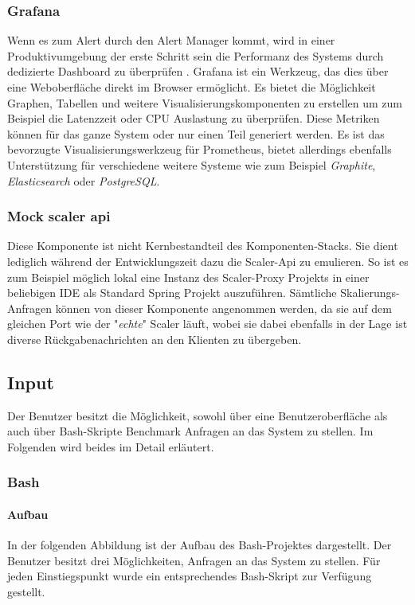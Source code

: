 \subsubsection{Grafana \checkmark}
Wenn es zum Alert durch den Alert Manager kommt, wird in einer Produktivumgebung der erste Schritt sein die Performanz des Systems durch dedizierte Dashboard zu überprüfen \cite[Seite~97]{oreillyPrometheus}. Grafana ist ein Werkzeug, das dies über eine Weboberfläche direkt im Browser ermöglicht. Es bietet die Möglichkeit Graphen, Tabellen und weitere Visualisierungskomponenten zu erstellen um zum Beispiel die Latenzzeit oder CPU Auslastung zu überprüfen. Diese Metriken können für das ganze System oder nur einen Teil generiert werden. Es ist das bevorzugte Visualisierungswerkzeug für Prometheus, bietet allerdings ebenfalls Unterstützung für verschiedene weitere Systeme wie zum Beispiel \emph{Graphite}, \emph{Elasticsearch} oder \emph{PostgreSQL}.


\subsubsection{Mock scaler api \checkmark}
Diese Komponente ist nicht Kernbestandteil des Komponenten-Stacks. Sie dient lediglich während der Entwicklungszeit dazu die Scaler-Api zu emulieren. So ist es zum Beispiel möglich lokal eine Instanz des Scaler-Proxy Projekts in einer beliebigen IDE als Standard Spring Projekt auszuführen. Sämtliche Skalierungs-Anfragen können von dieser Komponente angenommen werden, da sie auf dem gleichen Port wie der "\emph{echte}" Scaler läuft, wobei sie dabei ebenfalls in der Lage ist diverse Rückgabenachrichten an den Klienten zu übergeben.




\subsection{Input \checkmark}

Der Benutzer besitzt die Möglichkeit, sowohl über eine Benutzeroberfläche als auch über Bash-Skripte Benchmark Anfragen an das System zu stellen. Im Folgenden wird beides im Detail erläutert.

\subsubsection{Bash \checkmark}
\label{ss:bash}

\paragraph{Aufbau \checkmark}
In der folgenden Abbildung ist der Aufbau des Bash-Projektes dargestellt. Der Benutzer besitzt drei Möglichkeiten, Anfragen an das System zu stellen. Für jeden Einstiegspunkt wurde ein entsprechendes Bash-Skript zur Verfügung gestellt.

